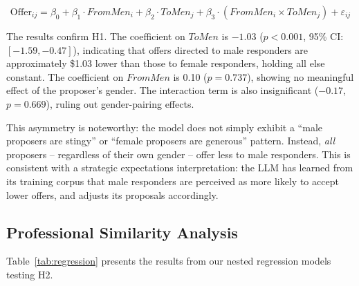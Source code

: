 \documentclass[12pt]{article}
\begin{document}
\begin{equation}
    \text{Offer}_{ij} = \beta_0 + \beta_1 \cdot \textit{FromMen}_i + \beta_2 \cdot \textit{ToMen}_j + \beta_3 \cdot (\textit{FromMen}_i \times \textit{ToMen}_j) + \varepsilon_{ij}
\end{equation}

The results confirm H1. The coefficient on $\textit{ToMen}$ is $-1.03$ ($p < 0.001$, 95\% CI: $[-1.59, -0.47]$), indicating that offers directed to male responders are approximately \$1.03 lower than those to female responders, holding all else constant. The coefficient on $\textit{FromMen}$ is 0.10 ($p = 0.737$), showing no meaningful effect of the proposer's gender. The interaction term is also insignificant ($-0.17$, $p = 0.669$), ruling out gender-pairing effects.

This asymmetry is noteworthy: the model does not simply exhibit a ``male proposers are stingy'' or ``female proposers are generous'' pattern. Instead, \emph{all} proposers -- regardless of their own gender -- offer less to male responders. This is consistent with a strategic expectations interpretation: the LLM has learned from its training corpus that male responders are perceived as more likely to accept lower offers, and adjusts its proposals accordingly.

\subsection{Professional Similarity Analysis}

Table~\ref{tab:regression} presents the results from our nested regression models testing H2.
\end{document}

